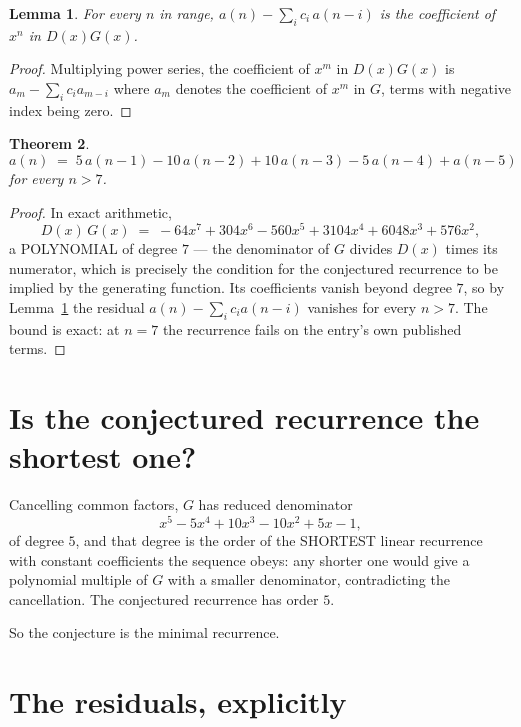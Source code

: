 \documentclass[11pt,a4paper]{article}
\theoremstyle{plain}
\newtheorem{theorem}{Theorem}
\newtheorem{lemma}[theorem]{Lemma}
\theoremstyle{definition}
\begin{document}
\begin{lemma}\label{lem:key}
For every $n$ in range, $a(n)-\sum_i c_i\,a(n-i)$ is the coefficient of $x^{n}$ in
$D(x)G(x)$.
\end{lemma}

\begin{proof}
Multiplying power series, the coefficient of $x^{m}$ in $D(x)G(x)$ is
$a_m-\sum_i c_i a_{m-i}$ where $a_m$ denotes the coefficient of $x^{m}$ in $G$, terms with
negative index being zero.
\end{proof}

\begin{theorem}
\[
a(n)\;=\;5\,a(n-1) - 10\,a(n-2) + 10\,a(n-3) - 5\,a(n-4) + a(n-5)
\]
for every $n>7$.
\end{theorem}

\begin{proof}
In exact arithmetic,
\[
D(x)\,G(x)\;=\;- 64 x^{7} + 304 x^{6} - 560 x^{5} + 3104 x^{4} + 6048 x^{3} + 576 x^{2},
\]
a POLYNOMIAL of degree $7$ --- the denominator of $G$ divides $D(x)$ times its numerator,
which is precisely the condition for the conjectured recurrence to be implied by the
generating function. Its coefficients vanish beyond degree $7$, so by
Lemma~\ref{lem:key} the residual $a(n)-\sum_ic_ia(n-i)$ vanishes for every
$n>7$. The bound is exact: at $n=7$ the recurrence fails on the entry's own published terms.
\end{proof}

\section{Is the conjectured recurrence the shortest one?}

Cancelling common factors, $G$ has reduced denominator
\[
x^{5} - 5 x^{4} + 10 x^{3} - 10 x^{2} + 5 x - 1,
\]
of degree $5$, and that degree is the order of the SHORTEST linear recurrence with
constant coefficients the sequence obeys: any shorter one would give a polynomial multiple of
$G$ with a smaller denominator, contradicting the cancellation. The conjectured recurrence has
order $5$.

So the conjecture is the minimal recurrence.

\section{The residuals, explicitly}
\end{document}
